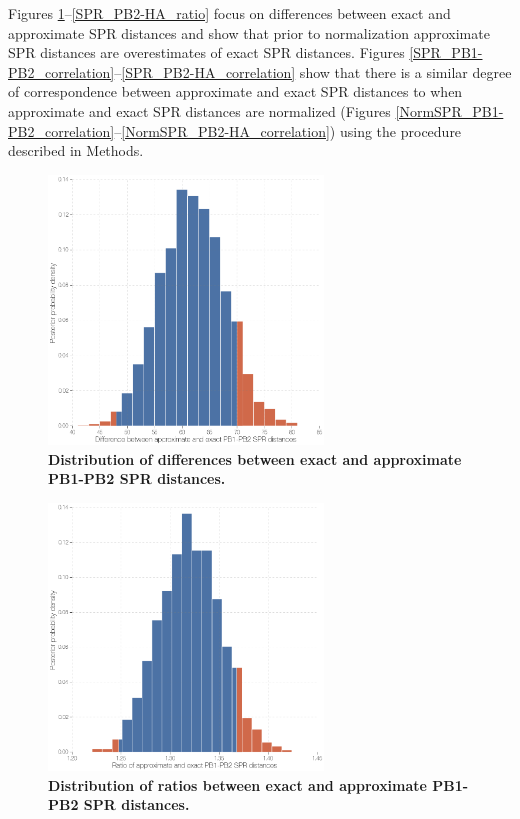 \documentclass[11pt,oneside,letterpaper]{article}
\begin{document}
\clearpage

Figures \ref{SPR_PB1-PB2_difference}--\ref{SPR_PB2-HA_ratio} focus on differences between exact and approximate SPR distances and show that prior to normalization approximate SPR distances are overestimates of exact SPR distances.
Figures \ref{SPR_PB1-PB2_correlation}--\ref{SPR_PB2-HA_correlation} show that there is a similar degree of correspondence between approximate and exact SPR distances to when approximate and exact SPR distances are normalized (Figures \ref{NormSPR_PB1-PB2_correlation}--\ref{NormSPR_PB2-HA_correlation}) using the procedure described in Methods.

\begin{figure}
\centering  
\includegraphics[width=0.65\textwidth]  {supp_figures/InfB_supp_PB1-PB2_hist.png}
\caption{\textbf{Distribution of differences between exact and approximate PB1-PB2 SPR distances.}}
\label{SPR_PB1-PB2_difference}
\end{figure}

\begin{figure}
\centering  
\includegraphics[width=0.65\textwidth]  {supp_figures/InfB_supp_PB1-PB2_hist2.png}
\caption{\textbf{Distribution of ratios between exact and approximate PB1-PB2 SPR distances.}}
\label{SPR_PB1-PB2_ratio}
\end{figure}
\end{document}
